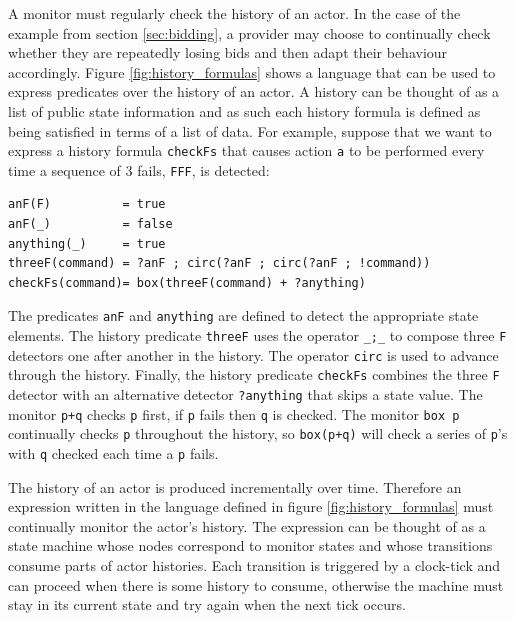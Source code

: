\documentclass[10pt,numbers]{sigplanconf}
\def\code#1{{\normalfont\lstinline[basicstyle=\small\ttfamily]{#1}}}
\begin{document}
A monitor must regularly check the history of an actor. In the case of the example from section \ref{sec:bidding}, a provider may choose to continually check whether they are repeatedly losing bids and then adapt their behaviour accordingly. Figure \ref{fig:history_formulas} shows a language that can be used to express predicates over the history of an actor. A history can be thought of as a list of public state information and as such each history formula is defined as being satisfied in terms of a list of data. For example, suppose that we want to express a history formula \code{checkFs} that causes action \code{a} to be performed every time a sequence of 3 fails, \code{FFF}, is detected:
\begin{lstlisting}
anF(F)          = true
anF(_)          = false
anything(_)     = true
threeF(command) = ?anF ; circ(?anF ; circ(?anF ; !command))
checkFs(command)= box(threeF(command) + ?anything)
\end{lstlisting}
The predicates \code{anF} and \code{anything} are defined to detect the appropriate state elements. The history predicate \code{threeF} uses the operator \code{_;_} to compose three \code{F} detectors one after another in the history. The operator \code{circ} is used to advance through the history. Finally, the history predicate \code{checkFs} combines the three \code{F} detector with an alternative detector \code{?anything} that skips a state value. The monitor \code{p+q} checks \code{p} first, if \code{p} fails then \code{q} is checked. The monitor \code{box p} continually checks \code{p} throughout the history, so \code{box(p+q)} will check a series of \code{p}'s with \code{q} checked each time a \code{p} fails.

The history of an actor is produced incrementally over time. Therefore an expression written in the language defined in figure \ref{fig:history_formulas} must continually monitor the actor's history. The expression can be thought of as a state machine whose nodes correspond to monitor states and whose transitions consume parts of actor histories. Each transition is triggered by a clock-tick and can proceed when there is some history to consume, otherwise the machine must stay in its current state and try again when the next tick occurs.
\end{document}

